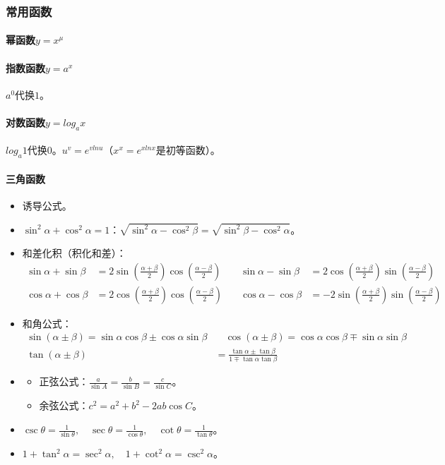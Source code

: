 \documentclass[
12pt, %
a4paper, 
oneside, %
]{scrartcl}
\begin{document}
\subsubsection[常用函数]{常用函数}
\paragraph{幂函数$ y = x^{\mu} $}
\paragraph{指数函数$ y = a^x $}
$ a^0 $代换$ 1 $。
\paragraph{对数函数$ y = log_a x $}
$ log_a 1 $代换$ 0 $。$ u^v = e^{v ln u} $（$ x^x = e^{x ln x} $是初等函数）。
\paragraph{三角函数}
\begin{itemize}
\item 诱导公式。
\item $ \sin^2\alpha + \cos^2\alpha = 1 $：$ \sqrt{\sin^2\alpha - \cos^2\beta} = \sqrt{\sin^2\beta - \cos^2\alpha} $。
\item 和差化积（积化和差）：
\begin{align*}
\sin\alpha + \sin\beta &= 2\sin(\frac{\alpha + \beta}{2}) \cos(\frac{\alpha - \beta}{2}) \quad &
\sin\alpha - \sin\beta &= 2\cos(\frac{\alpha + \beta}{2}) \sin(\frac{\alpha - \beta}{2}) \\
\cos\alpha + \cos\beta &= 2\cos(\frac{\alpha + \beta}{2}) \cos(\frac{\alpha - \beta}{2}) \quad &
\cos\alpha - \cos\beta &= -2\sin(\frac{\alpha + \beta}{2}) \sin(\frac{\alpha - \beta}{2})
\end{align*}
\item 和角公式：
\begin{align*}
\sin(\alpha \pm \beta) = \sin\alpha \cos\beta \pm \cos\alpha \sin\beta & \quad
\cos(\alpha \pm \beta) = \cos\alpha \cos\beta \mp \sin\alpha \sin\beta \\
\tan(\alpha \pm \beta) &= \frac{\tan\alpha \pm \tan\beta}{1 \mp \tan\alpha \tan\beta}
\end{align*}
\item 
\begin{itemize}
\item 正弦公式：$ \frac{a}{\sin A} = \frac{b}{\sin B} = \frac{c}{\sin C} $。
\item 余弦公式：$ c^2 = a^2 + b^2 - 2ab \cos C $。
\end{itemize}
\item $ \csc\theta = \frac{1}{\sin\theta}, \quad \sec\theta = \frac{1}{\cos\theta}, \quad \cot\theta = \frac{1}{\tan\theta} $。
\item $ 1 + \tan^2\alpha = \sec^2\alpha, \quad 1 + \cot^2\alpha = \csc^2\alpha $。
\end{itemize}
\end{document}
